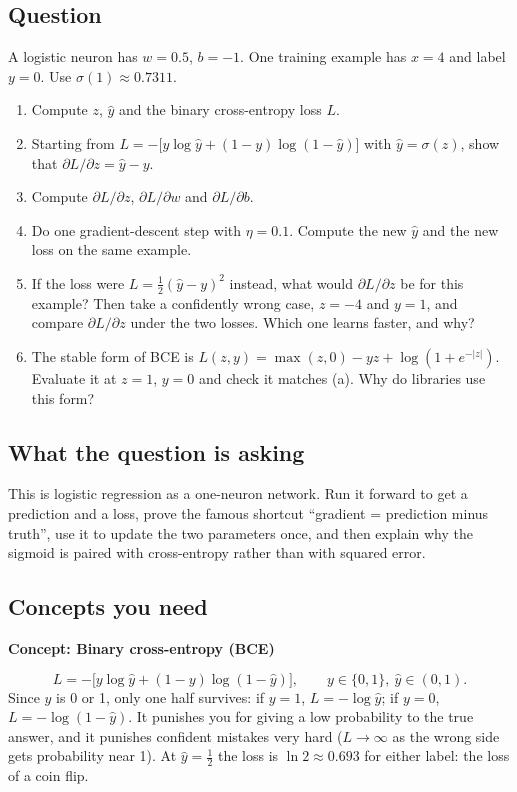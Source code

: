 \documentclass[12pt,a4paper]{article}
\newcommand{\concept}[2]{\par\medskip\phantomsection\label{#1}{\large\bfseries\color{blue!50!black} Concept: #2}\par}
\begin{document}
\subsection*{Question}
A logistic neuron has $w=0.5$, $b=-1$. One training example has $x=4$ and label $y=0$. Use $\sigma(1)\approx0.7311$.
\begin{enumerate}[label=(\alph*)]
\item Compute $z$, $\hat y$ and the binary cross-entropy loss $L$.
\item Starting from $L=-\bigl[y\log\hat y+(1-y)\log(1-\hat y)\bigr]$ with $\hat y=\sigma(z)$, show that $\partial L/\partial z=\hat y-y$.
\item Compute $\partial L/\partial z$, $\partial L/\partial w$ and $\partial L/\partial b$.
\item Do one gradient-descent step with $\eta=0.1$. Compute the new $\hat y$ and the new loss on the same example.
\item If the loss were $L=\tfrac12(\hat y-y)^2$ instead, what would $\partial L/\partial z$ be for this example? Then take a confidently wrong case, $z=-4$ and $y=1$, and compare $\partial L/\partial z$ under the two losses. Which one learns faster, and why?
\item The stable form of BCE is $L(z,y)=\max(z,0)-yz+\log(1+e^{-|z|})$. Evaluate it at $z=1$, $y=0$ and check it matches (a). Why do libraries use this form?
\end{enumerate}

\subsection*{What the question is asking}
This is logistic regression as a one-neuron network. Run it forward to get a prediction and a loss, prove the famous shortcut ``gradient = prediction minus truth'', use it to update the two parameters once, and then explain why the sigmoid is paired with cross-entropy rather than with squared error.

\subsection*{Concepts you need}

\concept{c:bce}{Binary cross-entropy (BCE)}
\[
L=-\bigl[y\log\hat y+(1-y)\log(1-\hat y)\bigr],\qquad y\in\{0,1\},\ \hat y\in(0,1).
\]
Since $y$ is 0 or 1, only one half survives: if $y=1$, $L=-\log\hat y$; if $y=0$, $L=-\log(1-\hat y)$. It punishes you for giving a low probability to the true answer, and it punishes confident mistakes very hard ($L\to\infty$ as the wrong side gets probability near 1). At $\hat y=\tfrac12$ the loss is $\ln2\approx0.693$ for either label: the loss of a coin flip.
\end{document}
